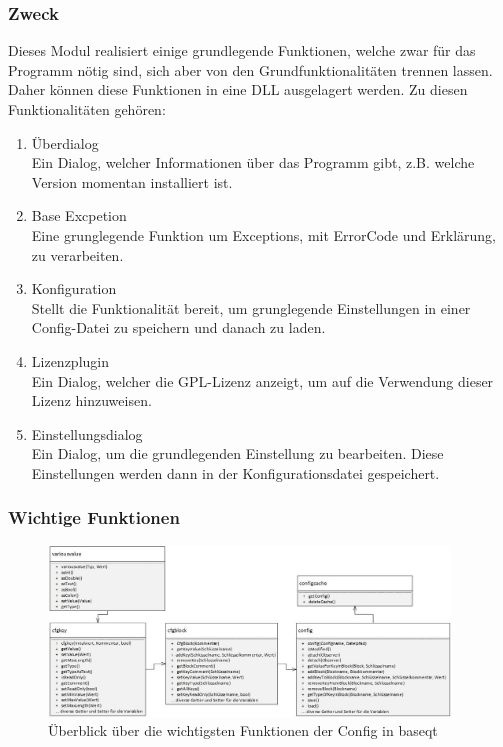 \subsubsection{Zweck}
Dieses Modul realisiert einige grundlegende Funktionen, welche zwar für das
Programm nötig sind, sich aber von den Grundfunktionalitäten trennen lassen. 
Daher können diese Funktionen in eine DLL ausgelagert werden. Zu diesen 
Funktionalitäten gehören:
\begin{enumerate}
\item{Überdialog}\\
	Ein Dialog, welcher Informationen über das Programm gibt, z.B. welche Version
	momentan installiert ist.
\item{Base Excpetion}\\
	Eine grunglegende Funktion um Exceptions, mit ErrorCode und Erklärung, zu verarbeiten.
\item{Konfiguration}\\
	Stellt die Funktionalität bereit, um grunglegende Einstellungen in einer Config-Datei
	zu speichern und danach zu laden.
\item{Lizenzplugin}\\
	Ein Dialog, welcher die GPL-Lizenz anzeigt, um auf die Verwendung dieser Lizenz hinzuweisen.
\item{Einstellungsdialog}\\
	Ein Dialog, um die grundlegenden Einstellung zu bearbeiten. Diese Einstellungen werden dann
	in der Konfigurationsdatei gespeichert.
\end{enumerate} 
\subsubsection{Wichtige Funktionen}
\begin{figure}[H]
	\centering
		\includegraphics[width=0.95\textwidth]{figures/baseqt.jpg}
	\caption{Überblick über die wichtigsten Funktionen der Config in baseqt}
	\label{fig:baseqt}
\end{figure}
